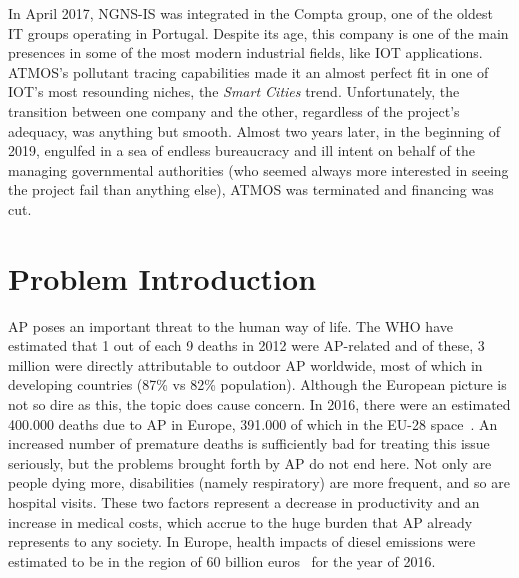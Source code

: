 In April 2017, NGNS-IS was integrated in the Compta group, one of the
oldest IT groups operating in Portugal. Despite its age, this company is
one of the main presences in some of the most modern industrial fields,
like \gls{IOT} applications. \gls{ATMOS}'s pollutant tracing
capabilities made it an almost perfect fit in one of \gls{IOT}'s most
resounding niches, the \emph{Smart Cities} trend. Unfortunately, the
transition between one company and the other, regardless of the
project's adequacy, was anything but smooth. Almost two years later, in
the beginning of 2019, engulfed in a sea of endless bureaucracy and ill
intent on behalf of the managing governmental authorities (who seemed
always more interested in seeing the project fail than anything else),
\gls{ATMOS} was terminated and financing was cut.



\section{Problem Introduction}%
\label{sec:problem_introduction}

\acrlong{AP} poses an important threat to the human way of life. The
\gls{WHO} have estimated that 1 out of each 9 deaths in 2012 were
\gls{AP}-related and of these, 3 million were directly attributable to
outdoor \gls{AP} worldwide, most of which in developing countries (87\%
vs 82\% population). Although the European picture is not so dire as
this, the topic does cause concern. In 2016, there were an estimated
400.000 deaths due to \gls{AP} in Europe, 391.000 of which in the EU-28
space~\cite{Guerreiro2019}. An increased number of premature deaths is
sufficiently bad for treating this issue seriously, but the problems
brought forth by \acrlong{AP} do not end here. Not only are people dying
more, disabilities (namely respiratory) are more frequent, and so are
hospital visits. These two factors represent a decrease in productivity
and an increase in medical costs, which accrue to the huge burden that
\gls{AP} already represents to any society. In Europe, health impacts of
diesel emissions were estimated to be in the region of 60 billion
euros~\cite{CEDelft2018} for the year of 2016.

